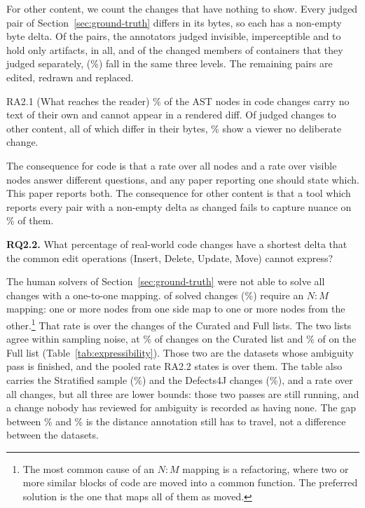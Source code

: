 \documentclass[sigconf,review]{acmart}
\begin{document}
For other content, we count the changes that have nothing to show. Every judged pair of
Section~\ref{sec:ground-truth} differs in its bytes, so each has a non-empty byte delta. Of the
\ContentVerdictPairs{} pairs, the annotators judged \ContentVerdictInvisible{} invisible,
\ContentVerdictImperceptible{} imperceptible and \ContentVerdictArtifacts{} to hold only
artifacts, \ContentVerdictNothing{} in all, and of the \ContentVerdictMembers{} changed members
of containers that they judged separately, \ContentVerdictMembersNothing{}
(\ContentVerdictMembersNothingPct{}\%) fall in the same three levels. The remaining pairs are
\ContentVerdictEdited{} edited, \ContentVerdictRedrawn{} redrawn and \ContentVerdictReplaced{}
replaced.

\begin{resultbox}{RA2.1 (What reaches the reader)}
  \InvisibleNodeShare{}\% of the AST nodes in \NumFixtures{} code changes carry no text of their
  own and cannot appear in a rendered diff. Of \ContentVerdictPairs{} judged changes to other
  content, all of which differ in their bytes, \ContentVerdictNothingPct{}\% show a viewer no
  deliberate change.
\end{resultbox}

The consequence for code is that a rate over all nodes and a rate over visible nodes answer different questions, and any paper reporting
one should state which. This paper reports both. The consequence for other content is that a
tool which reports every pair with a non-empty delta as changed fails to capture
nuance on \ContentVerdictNothingPct{}\% of them.

\textbf{RQ2.2.} What percentage of real-world code changes have a shortest delta that the
common edit operations (Insert, Delete, Update, Move) cannot express?

The human solvers of Section~\ref{sec:ground-truth} were not able to solve all changes with a
one-to-one mapping. \AmbiguityListWith{} of \AmbiguityListScored{} solved changes
(\AmbiguityListPct{}\%) require an $N{:}M$ mapping: one or more nodes from one side map to one or
more nodes from the other.\footnote{The most common cause of an $N{:}M$ mapping is a refactoring,
where two or more similar blocks of code are moved into a common function. The preferred solution
is the one that maps all of them as moved.} That rate is over the \AmbiguityListScored{} changes
of the Curated and Full lists. The two lists agree within sampling noise, at
\AmbiguityCuratedPct{}\% of \AmbiguityCuratedTotal{} changes on the Curated list and
\AmbiguityFullPct{}\% of \AmbiguityFullTotal{} on the Full list
(Table~\ref{tab:expressibility}). Those two are the datasets whose ambiguity pass is finished, and
the pooled rate RA2.2 states is over them. The table also carries the Stratified sample
(\AmbiguityStratifiedPct{}\%) and the Defects4J changes (\AmbiguityDefectsFourJPct{}\%), and a
rate over all \AmbiguityScored{} changes, but all three are lower bounds: those two passes are
still running, and a change nobody has reviewed for ambiguity is recorded as having none. The gap
between \AmbiguityListPct{}\% and \AmbiguityAnyPct{}\% is the distance annotation still has to
travel, not a difference between the datasets.
\end{document}
